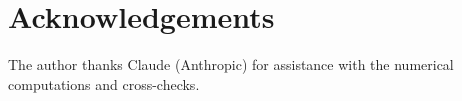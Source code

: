 \documentclass[12pt,a4paper]{article}
\theoremstyle{definition}
\begin{document}

\section*{Acknowledgements}

The author thanks Claude (Anthropic) for assistance with the numerical computations and cross-checks.




\end{document}

